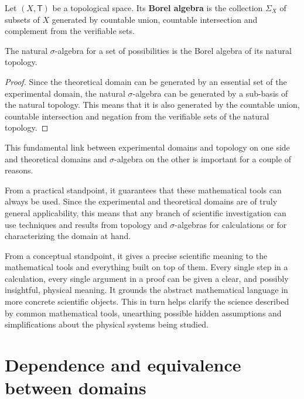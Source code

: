 \documentclass[11pt,letterpaper,fleqn]{memoir} %
\begin{document}
\begin{mathSection}
	
	\begin{defn}
		Let $(X, \mathsf{T})$ be a topological space. Its \textbf{Borel algebra} is the collection $\Sigma_X$ of subsets of $X$ generated by countable union, countable intersection and complement from the verifiable sets.
	\end{defn}
	
	\begin{prop}
		The natural $\sigma$-algebra for a set of possibilities is the Borel algebra of its natural topology.
	\end{prop}
	
	\begin{proof}
		Since the theoretical domain can be generated by an essential set of the experimental domain, the natural $\sigma$-algebra can be generated by a sub-basis of the natural topology. This means that it is also generated by the countable union, countable intersection and negation from the verifiable sets of the natural topology.
	\end{proof}
\end{mathSection}

This fundamental link between experimental domains and topology on one side and theoretical domains and $\sigma$-algebra on the other is important for a couple of reasons.

From a practical standpoint, it guarantees that these mathematical tools can always be used. Since the experimental and theoretical domains are of truly general applicability, this means that any branch of scientific investigation can use techniques and results from topology and $\sigma$-algebras for calculations or for characterizing the domain at hand.

From a conceptual standpoint, it gives a precise scientific meaning to the mathematical tools and everything built on top of them. Every single step in a calculation, every single argument in a proof can be given a clear, and possibly insightful, physical meaning. It grounds the abstract mathematical language in more concrete scientific objects. This in turn helps clarify the science described by common mathematical tools, unearthing possible hidden assumptions and simplifications about the physical systems being studied.

\section{Dependence and equivalence between domains}
\end{document}
